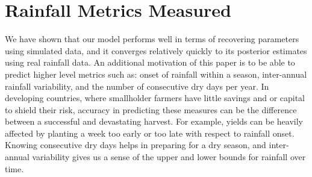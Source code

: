 \documentclass[12pt]{article}
\begin{document}








\section{Rainfall Metrics Measured}
\label{sec:metrics}

We have shown that our model performs well in terms of recovering parameters using simulated data, and it converges relatively quickly to its posterior estimates using real rainfall data. An additional motivation of this paper is to be able to predict higher level metrics such as: onset of rainfall within a season, inter-annual rainfall variability, and the number of consecutive dry days per year. In developing countries, where smallholder farmers have little savings and or capital to shield their risk, accuracy in predicting these measures can be the difference between a successful and devastating harvest. For example, yields can be heavily affected by planting a week too early or too late with respect to rainfall onset. Knowing consecutive dry days helps in preparing for a dry season, and inter-annual variability gives us a sense of the upper and lower bounds for rainfall over time. 
\end{document}
